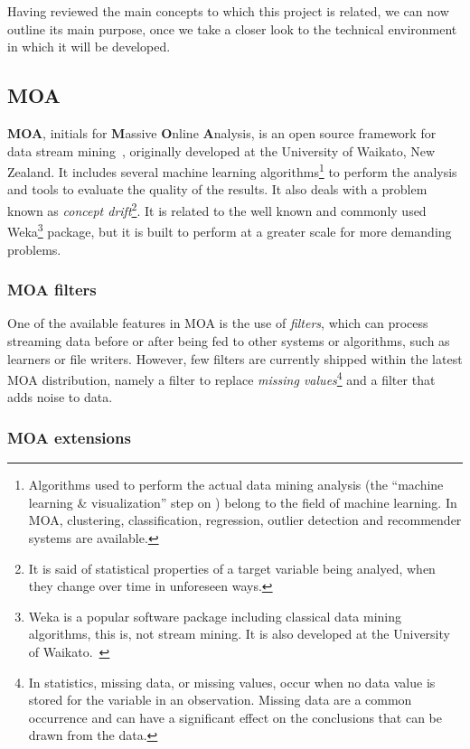 Having reviewed the main concepts to which this project is related, we can now outline
its main purpose, once we take a closer look to the technical environment in which it
will be developed.

\subsection{MOA}

\textbf{MOA}, initials for \textbf{M}assive \textbf{O}nline \textbf{A}nalysis, is an 
open source framework for data stream mining~\citep{web:MOA}, originally 
developed at the University of Waikato, New Zealand. It includes several machine learning 
algorithms\footnote{Algorithms used to perform the actual data mining analysis (the 
“machine learning \& visualization” step on ) belong to the 
field of machine learning. In MOA, clustering, classification, regression, outlier 
detection and recommender systems are available.} to perform the analysis and tools 
to evaluate the quality of the results. It also deals with a problem known as 
\textit{concept drift}\footnote{It is said of statistical properties of a target variable 
being analyed, when they change over time in unforeseen ways.}. It is related to the well
known and commonly used Weka\footnote{Weka is a popular software package including 
classical data mining algorithms, this is, not stream mining. It is also developed at 
the University of Waikato.~\citep{web:Weka}} package, but it is built to perform at 
a greater scale for more demanding problems.

\subsubsection{MOA filters}

One of the available features in MOA is the use of \textit{filters}, which can process
streaming data before or after being fed to other systems or algorithms, such as learners
or file writers. However, few filters are currently shipped within the latest MOA distribution,
namely a filter to replace \textit{missing values}\footnote{In statistics, missing data, or missing values, 
occur when no data value is stored for the variable in an observation. Missing data are a 
common occurrence and can have a significant effect on the conclusions that can be drawn 
from the data.} and a filter that adds noise to data.

\subsubsection{MOA extensions}


